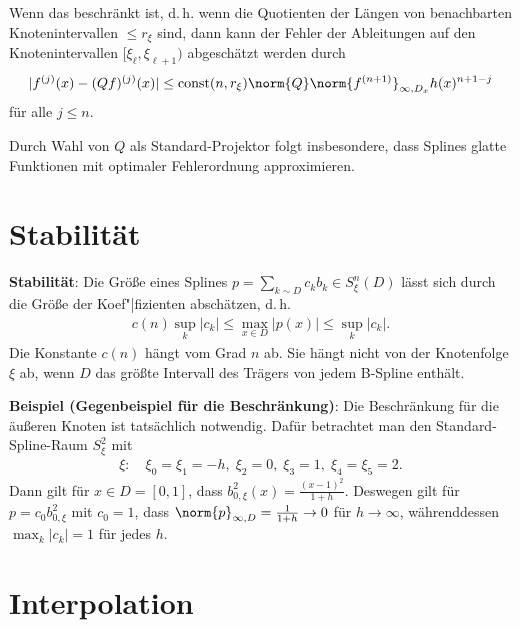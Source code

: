 Wenn das  beschränkt ist, d.\,h. wenn die Quotienten der Längen
von benachbarten Knotenintervallen $\le r_\xi$ sind, dann kann der Fehler der Ableitungen auf den
Knotenintervallen $[\xi_\ell, \xi_{\ell+1})$ abgeschätzt werden durch
\begin{align*}
    |f^{(j)}(x) - (Qf)^{(j)}(x)| \le \text{const}(n, r_\xi) \norm{Q}
    \norm{f^{(n+1)}}_{\infty,D_x} h(x)^{n+1-j}
\end{align*}
für alle $j \le n$.

Durch Wahl von $Q$ als Standard-Projektor folgt insbesondere, dass Splines glatte Funktionen mit
optimaler Fehlerordnung approximieren.

\section{%
    Stabilität%
}

\textbf{Stabilität}:
Die Größe eines Splines $p = \sum_{k \sim D} c_k b_k \in S_\xi^n(D)$
lässt sich durch die Größe der Koef"|fizienten abschätzen, d.\,h.
\begin{align*}
    c(n) \sup_k |c_k| \le \max_{x \in D} |p(x)| \le \sup_k |c_k|.
\end{align*}
Die Konstante $c(n)$ hängt vom Grad $n$ ab.
Sie hängt nicht von der Knotenfolge $\xi$ ab, wenn $D$ das größte Intervall des Trägers von jedem
B-Spline enthält.

\linie

\textbf{Beispiel (Gegenbeispiel für die Beschränkung)}:
Die Beschränkung für die äußeren Knoten ist tatsächlich notwendig.
Dafür betrachtet man den Standard-Spline-Raum $S_\xi^2$ mit
\begin{align*}
    \xi\colon\quad
    \xi_0 = \xi_1 = -h,\;
    \xi_2 = 0,\;
    \xi_3 = 1,\;
    \xi_4 = \xi_5 = 2.
\end{align*}
Dann gilt für $x \in D = [0, 1]$, dass $b_{0,\xi}^2(x) = \frac{(x - 1)^2}{1 + h}$.
Deswegen gilt für $p = c_0 b_{0,\xi}^2$ mit $c_0 = 1$, dass
$\norm{p}_{\infty,D} = \frac{1}{1 + h} \to 0$ für $h \to \infty$,
währenddessen $\max_k |c_k| = 1$ für jedes $h$.

\pagebreak

\section{%
    Interpolation%
}

